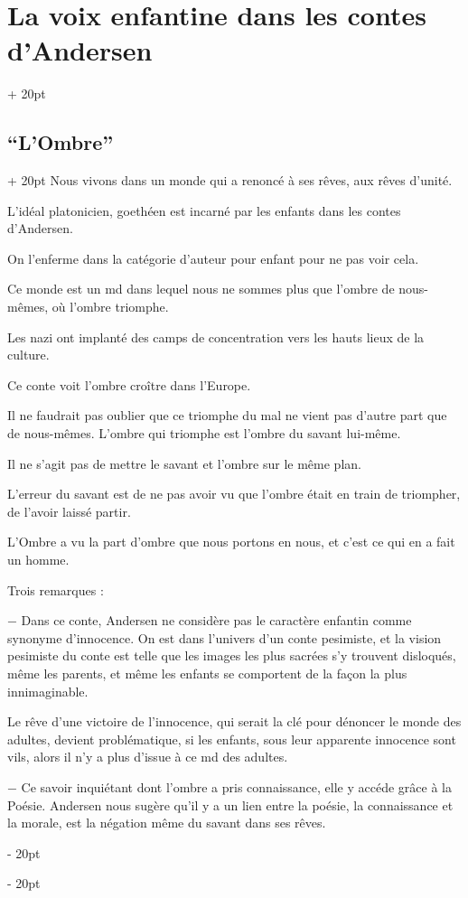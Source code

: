 \documentclass[a4paper, 12pt, twoside]{article}
\newcommand{\ind}[1][20pt]{\advance\leftskip + #1}
\newcommand{\deind}[1][20pt]{\advance\leftskip - #1}
\newenvironment{indt}[2][20pt]{#2 \par \ind[#1]}{\par \deind} %
\begin{document}
\begin{indt}{\section{La voix enfantine dans les contes d'Andersen}}
\begin{indt}{\subsection{``L'Ombre''}}
            Nous vivons dans un monde qui a renoncé à ses rêves, aux rêves d'unité.
            
            L'idéal platonicien, goethéen est incarné par les enfants dans les contes d'Andersen.
            
            On l'enferme dans la catégorie d'auteur pour enfant pour ne pas voir cela.
            
            Ce monde est un md dans lequel nous ne sommes plus que l'ombre de nous-mêmes, où l'ombre triomphe.
            
            Les nazi ont implanté des camps de concentration vers les hauts lieux de la culture.
            
            Ce conte voit l'ombre croître dans l'Europe.
            
            Il ne faudrait pas oublier que ce triomphe du mal ne vient pas d'autre part que  de nous-mêmes. L'ombre qui triomphe est l'ombre du savant lui-même.
            
            Il ne s'agit pas de mettre le savant et l'ombre sur le même plan.
            
            L'erreur du savant est de ne pas avoir vu que l'ombre était en train de triompher, de l'avoir laissé partir.
            
            
            L'Ombre a vu la part d'ombre que nous portons en nous, et c'est ce qui en a fait un homme.
            
            \vspace{12pt}
            
            Trois remarques :
            
            $-$ Dans ce conte, Andersen ne considère pas le caractère enfantin comme synonyme d'innocence. On est dans l'univers d'un conte pesimiste, et la vision pesimiste du conte est telle que les images les plus sacrées s'y trouvent disloqués, même les parents, et même les enfants se comportent de la façon la plus innimaginable.
            
            Le rêve d'une victoire de l'innocence, qui serait la clé pour dénoncer le monde des adultes, devient problématique, si les enfants, sous leur apparente innocence sont vils, alors il n'y a plus d'issue à ce md des adultes.
            
            \vspace{12pt}
            
            $-$ Ce savoir inquiétant dont l'ombre a pris connaissance, elle y accéde grâce à la Poésie. Andersen nous sugère qu'il y a un lien entre la poésie, la connaissance et la morale, est la négation même du savant dans ses rêves.
            

\end{indt}
\end{indt}
\end{document}
